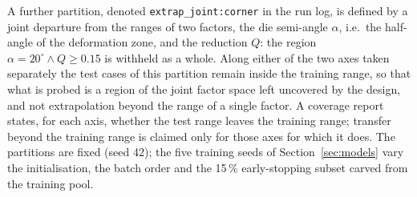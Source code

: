 A further partition, denoted \texttt{extrap\_joint:corner} in the run log, is defined by a joint departure from the ranges of two factors, the die semi-angle $\alpha$, i.e.\ the half-angle of the deformation zone, and the reduction $Q$: the region $\alpha = 20^\circ \wedge Q \ge 0.15$ is withheld as a whole. Along either of the two axes taken separately the test cases of this partition remain inside the training range, so that what is probed is a region of the joint factor space left uncovered by the design, and not extrapolation beyond the range of a single factor. %
A coverage report states, for each axis, whether the test range leaves the training range; transfer beyond the training range is claimed only for those axes for which it does. %
The partitions are fixed (seed 42); the five training seeds of Section~\ref{sec:models} vary the initialisation, the batch order and the 15\,\% early-stopping subset carved from the training pool. %

